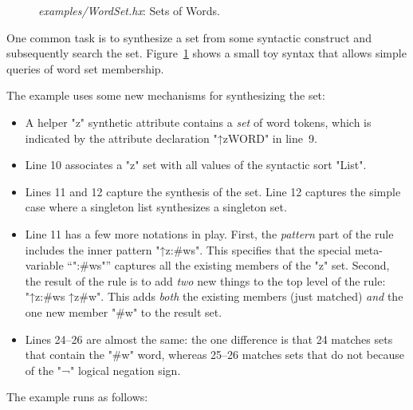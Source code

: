 \documentclass[11pt]{article} %
\begin{document}
\begin{figure}[p]
  \caption{\emph{examples/WordSet.hx}: Sets of Words.}
  \label{fig:wordset}
\end{figure}

\begin{example}
  One common task is to synthesize a set from some syntactic construct and subsequently search the
  set. Figure~\ref{fig:wordset} shows a small toy syntax that allows simple queries of word set
  membership.

  The example uses some new mechanisms for synthesizing the set:
  \begin{itemize}

  \item A helper "z" synthetic attribute contains a \emph{set} of word tokens, which is indicated by
    the attribute declaration "↑z{WORD}" in line~9.

  \item Line 10 associates a "z" set with all values of the syntactic sort "List".

  \item Lines 11 and 12 capture the synthesis of the set. Line 12 captures the simple case where a
    singleton list synthesizes a singleton set.

  \item Line 11 has a few more notations in play.  First, the \emph{pattern} part of the rule
    includes the inner pattern "↑z{:#ws}". This specifies that the special meta-variable ``":#ws"''
    captures all the existing members of the "z" set.  Second, the result of the rule is to add
    \emph{two} new things to the top level of the rule: "↑z{:#ws} ↑z{#w}". This adds \emph{both} the
    existing members (just matched) \emph{and} the one new member "#w" to the result set.

  \item Lines 24--26 are almost the same: the one difference is that 24 matches sets that contain
    the "#w" word, whereas 25--26 matches sets that do not because of the "¬" logical negation sign.
  \end{itemize}
  The example runs as follows:
\end{example}
\end{document}
